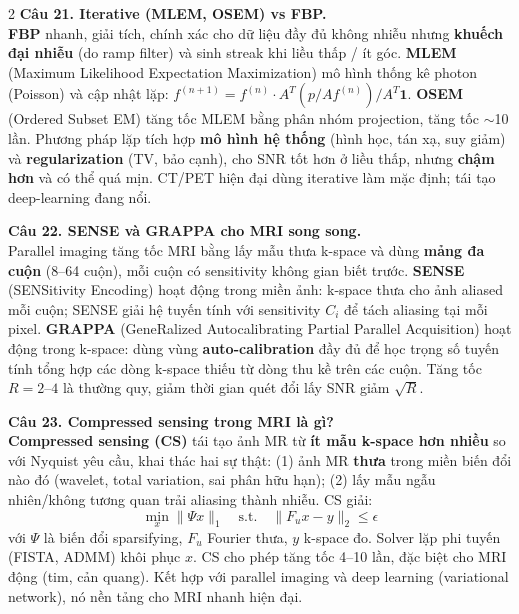 \begin{paracol}{2}
\textbf{Câu 21. Iterative (MLEM, OSEM) vs FBP.}\\
\textbf{FBP} nhanh, giải tích, chính xác cho dữ liệu đầy đủ không nhiễu nhưng \textbf{khuếch đại nhiễu} (do ramp filter) và sinh streak khi liều thấp / ít góc. \textbf{MLEM} (Maximum Likelihood Expectation Maximization) mô hình thống kê photon (Poisson) và cập nhật lặp: $f^{(n+1)} = f^{(n)} \cdot A^T(p / Af^{(n)}) / A^T \mathbf{1}$. \textbf{OSEM} (Ordered Subset EM) tăng tốc MLEM bằng phân nhóm projection, tăng tốc $\sim$10 lần. Phương pháp lặp tích hợp \textbf{mô hình hệ thống} (hình học, tán xạ, suy giảm) và \textbf{regularization} (TV, bảo cạnh), cho SNR tốt hơn ở liều thấp, nhưng \textbf{chậm hơn} và có thể quá mịn. CT/PET hiện đại dùng iterative làm mặc định; tái tạo deep-learning đang nổi.

\textbf{Câu 22. SENSE và GRAPPA cho MRI song song.}\\
Parallel imaging tăng tốc MRI bằng lấy mẫu thưa k-space và dùng \textbf{mảng đa cuộn} (8--64 cuộn), mỗi cuộn có sensitivity không gian biết trước. \textbf{SENSE} (SENSitivity Encoding) hoạt động trong miền ảnh: k-space thưa cho ảnh aliased mỗi cuộn; SENSE giải hệ tuyến tính với sensitivity $C_i$ để tách aliasing tại mỗi pixel. \textbf{GRAPPA} (GeneRalized Autocalibrating Partial Parallel Acquisition) hoạt động trong k-space: dùng vùng \textbf{auto-calibration} đầy đủ để học trọng số tuyến tính tổng hợp các dòng k-space thiếu từ dòng thu kề trên các cuộn. Tăng tốc $R = 2$--$4$ là thường quy, giảm thời gian quét đổi lấy SNR giảm $\sqrt{R}$.

\textbf{Câu 23. Compressed sensing trong MRI là gì?}\\
\textbf{Compressed sensing (CS)} tái tạo ảnh MR từ \textbf{ít mẫu k-space hơn nhiều} so với Nyquist yêu cầu, khai thác hai sự thật: (1) ảnh MR \textbf{thưa} trong miền biến đổi nào đó (wavelet, total variation, sai phân hữu hạn); (2) lấy mẫu ngẫu nhiên/không tương quan trải aliasing thành nhiễu. CS giải:
$$\min_x \|\Psi x\|_1 \quad \text{s.t.} \quad \|F_u x - y\|_2 \leq \epsilon$$
với $\Psi$ là biến đổi sparsifying, $F_u$ Fourier thưa, $y$ k-space đo. Solver lặp phi tuyến (FISTA, ADMM) khôi phục $x$. CS cho phép tăng tốc 4--10 lần, đặc biệt cho MRI động (tim, cản quang). Kết hợp với parallel imaging và deep learning (variational network), nó nền tảng cho MRI nhanh hiện đại.


\end{paracol}
